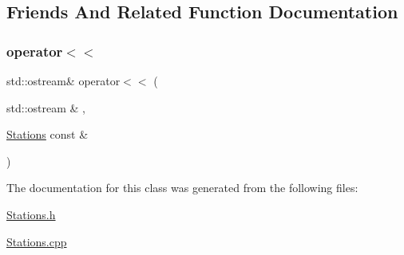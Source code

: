 \subsection{Friends And Related Function Documentation}
\mbox{\label{class_stations_a6c2ba44849c083fa6d206d4573ea523e}} 
\subsubsection{\texorpdfstring{operator$<$$<$}{operator<<}}
{\footnotesize\ttfamily std\+::ostream\& operator$<$$<$ (\begin{DoxyParamCaption}\item[{std\+::ostream \&}]{,  }\item[{\mbox{\hyperlink{class_stations}{Stations}} const \&}]{ }\end{DoxyParamCaption})\hspace{0.3cm}{\ttfamily [friend]}}



The documentation for this class was generated from the following files\+:\begin{DoxyCompactItemize}
\item 
\mbox{\hyperlink{_stations_8h}{Stations.\+h}}\item 
\mbox{\hyperlink{_stations_8cpp}{Stations.\+cpp}}\end{DoxyCompactItemize}
